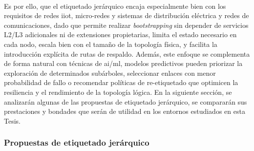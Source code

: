 \\
Es por ello, que el etiquetado jerárquico encaja especialmente bien con los requisitos de redes \gls{iiot}, micro-redes y sistemas de distribución eléctrica y redes de comunicaciones, dado que permite realizar \textit{bootstrapping} sin depender de servicios L2/L3 adicionales ni de extensiones propietarias, limita el estado necesario en cada nodo, escala bien con el tamaño de la topología física, y facilita la introducción explícita de rutas de respaldo. Además, este enfoque se complementa de forma natural con técnicas de \gls{ai}/\gls{ml}, modelos predictivos pueden priorizar la exploración de determinados subárboles, seleccionar enlaces con menor probabilidad de fallo o recomendar políticas de re-etiquetado que optimicen la resiliencia y el rendimiento de la topología lógica. En la siguiente sección, se analizarán algunas de las propuestas de etiquetado jerárquico, se compararán sus prestaciones y bondades que serán de utilidad en los entornos estudiados en esta Tesis.

 

\subsubsection{Propuestas de etiquetado jerárquico}
\label{subsubsec:propuestas_etiquetado}

